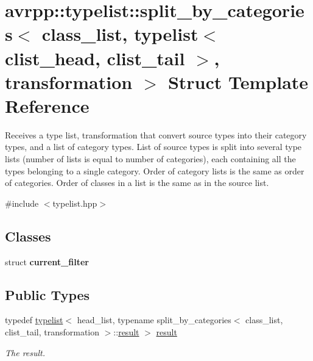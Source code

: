 \hypertarget{structavrpp_1_1typelist_1_1split__by__categories_3_01class__list_00_01typelist_3_01clist__head_0fa46119bbacf04c898014ff4be749bde}{
\section{avrpp::typelist::split\_\-by\_\-categories$<$ class\_\-list, typelist$<$ clist\_\-head, clist\_\-tail $>$, transformation $>$ Struct Template Reference}
\label{structavrpp_1_1typelist_1_1split__by__categories_3_01class__list_00_01typelist_3_01clist__head_0fa46119bbacf04c898014ff4be749bde}
}


Receives a type list, transformation that convert source types into their category types, and a list of category types. List of source types is split into several type lists (number of lists is equal to number of categories), each containing all the types belonging to a single category. Order of category lists is the same as order of categories. Order of classes in a list is the same as in the source list.  




{\ttfamily \#include $<$typelist.hpp$>$}

\subsection*{Classes}
\begin{DoxyCompactItemize}
\item 
struct {\bfseries current\_\-filter}
\end{DoxyCompactItemize}
\subsection*{Public Types}
\begin{DoxyCompactItemize}
\item 
typedef \hyperlink{structavrpp_1_1typelist_1_1typelist}{typelist}$<$ head\_\-list, typename split\_\-by\_\-categories$<$ class\_\-list, clist\_\-tail, transformation $>$::\hyperlink{structavrpp_1_1typelist_1_1typelist}{result} $>$ \hyperlink{structavrpp_1_1typelist_1_1split__by__categories_3_01class__list_00_01typelist_3_01clist__head_0fa46119bbacf04c898014ff4be749bde_a69ffa426e49eeba388aae05af3c33b9b}{result}
\begin{DoxyCompactList}\small\item\em The result. \item\end{DoxyCompactList}\end{DoxyCompactItemize}


